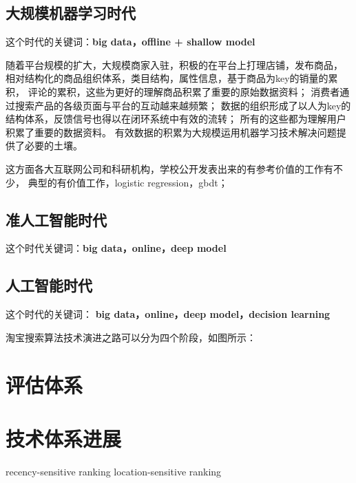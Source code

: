 \subsection{大规模机器学习时代}
这个时代的关键词：\textbf{big data，offline + shallow model}

随着平台规模的扩大，大规模商家入驻，积极的在平台上打理店铺，发布商品，
相对结构化的商品组织体系，类目结构，属性信息，基于商品为key的销量的累积，
评论的累积，这些为更好的理解商品积累了重要的原始数据资料；
消费者通过搜索产品的各级页面与平台的互动越来越频繁；
数据的组织形成了以人为key的结构体系，反馈信号也得以在闭环系统中有效的流转；
所有的这些都为理解用户积累了重要的数据资料。
有效数据的积累为大规模运用机器学习技术解决问题提供了必要的土壤。

这方面各大互联网公司和科研机构，学校公开发表出来的有参考价值的工作有不少，
典型的有价值工作，logistic regression，gbdt； 




\subsection{准人工智能时代}
这个时代关键词：\textbf{big data，online，deep model }



\subsection{人工智能时代} 
这个时代的关键词： \textbf{big data，online，deep model，decision learning}

淘宝搜索算法技术演进之路可以分为四个阶段，如图所示： 




\section{评估体系} 


\section{技术体系进展} 
recency-sensitive ranking
location-sensitive ranking 





